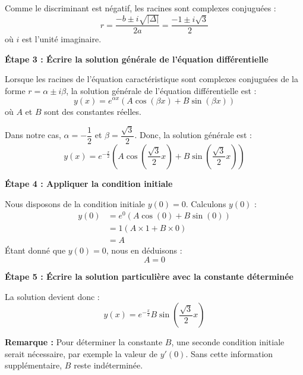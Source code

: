 \documentclass{article}
\begin{document}
Comme le discriminant est négatif, les racines sont complexes conjuguées :
\begin{equation*}
r = \frac{-b \pm i\sqrt{|\Delta|}}{2a} = \frac{-1 \pm i\sqrt{3}}{2}
\end{equation*}
où \( i \) est l'unité imaginaire.

\textbf{Étape 3 : Écrire la solution générale de l'équation différentielle}

Lorsque les racines de l'équation caractéristique sont complexes conjuguées de la forme \( r = \alpha \pm i\beta \), la solution générale de l'équation différentielle est :
\begin{equation*}
y(x) = e^{\alpha x} \left( A\cos(\beta x) + B\sin(\beta x) \right)
\end{equation*}
où \( A \) et \( B \) sont des constantes réelles.

Dans notre cas, \( \alpha = -\dfrac{1}{2} \) et \( \beta = \dfrac{\sqrt{3}}{2} \). Donc, la solution générale est :
\begin{equation*}
y(x) = e^{-\frac{x}{2}} \left( A\cos\left( \frac{\sqrt{3}}{2} x \right) + B\sin\left( \frac{\sqrt{3}}{2} x \right) \right)
\end{equation*}

\textbf{Étape 4 : Appliquer la condition initiale}

Nous disposons de la condition initiale \( y(0) = 0 \). Calculons \( y(0) \) :
\begin{align*}
y(0) &= e^{0} \left( A\cos\left( 0 \right) + B\sin\left( 0 \right) \right) \\
&= 1 \left( A \times 1 + B \times 0 \right) \\
&= A
\end{align*}
Étant donné que \( y(0) = 0 \), nous en déduisons :
\begin{equation*}
A = 0
\end{equation*}

\textbf{Étape 5 : Écrire la solution particulière avec la constante déterminée}

La solution devient donc :
\begin{equation*}
y(x) = e^{-\frac{x}{2}} B\sin\left( \frac{\sqrt{3}}{2} x \right)
\end{equation*}

\textbf{Remarque :} Pour déterminer la constante \( B \), une seconde condition initiale serait nécessaire, par exemple la valeur de \( y'(0) \). Sans cette information supplémentaire, \( B \) reste indéterminée.
\end{document}
